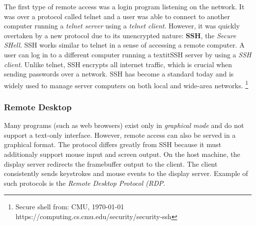 The first type of remote access was a login program listening on the network. It was over a protocol called
telnet and a user was able to connect to another computer running a \textit{telnet server} using a \textit{telnet client}.
However, it was quickly overtaken by a new protocol due to its unencrypted nature: \textbf{SSH}, the \textit{Secure SHell}.
SSH works similar to telnet in a sense of accessing a remote computer. A user can log in to a different
computer running a textit{SSH server} by using a \textit{SSH client}. Unlike telnet, SSH encrypts all internet traffic,
which is crucial when sending passwords over a network. SSH has become a standard today and is widely used to
manage server computers on both local and wide-area networks. \footnote{Secure shell from: CMU, \today \\ https://computing.cs.cmu.edu/security/security-ssh}

\subsubsection{Remote Desktop}

Many programs (such as web browsers) exist only in \textit{graphical mode} and do not support a text-only interface.
However, remote access can also be served in a graphical format. The protocol differs greatly from SSH because
it must additionaly support mouse input and screen output. On the host machine, the display server redirects
the framebuffer output to the client. The client consistently sends keystrokes and mouse events to the display
server. Example of such protocols is the \textit{Remote Desktop Protocol (RDP}.
